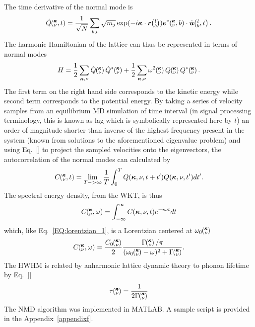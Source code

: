 %
The time derivative of the normal mode is
%
\begin{equation}
\dot{Q}\kvt=\frac{1}{\sqrt{N}}\sum_{b,l}\sqrt{m_j}\exp(-i\bm{\kappa}\cdot\bm{r}\lb)\bm{e}^*\kvb\cdot\dot{\bm{u}}\lbt.
\end{equation}
%
The harmonic Hamiltonian of the lattice can thus be represented in terms of normal modes
%
\begin{equation}
H=\frac{1}{2}\sum_{\bm{\kappa},\nu}\dot{Q}\kv\dot{Q}^*\kv+\frac{1}{2}\sum_{\bm{\kappa},\nu}\omega^2\kv Q\kv Q^*\kv.
\end{equation}
%
The first term on the right hand side corresponds to the kinetic energy while second term corresponds to the potential energy. By taking a series of velocity samples from an equilibrium MD simulation of time interval (in signal processing terminology, this is known as lag which is symbolically represented here by $t$) an order of magnitude shorter than inverse of the highest frequency present in the system (known from solutions to the aforementioned eigenvalue problem) and using Eq.~\ref{} to project the sampled velocities onto the eigenvectors, the autocorrelation of the normal modes can calculated by
%
\begin{equation}
C\mspace{-4.0mu}\left(\mspace{-8.0mu} \begin{smallmatrix}&\pmb{\kappa} \\&\nu\end{smallmatrix} \mspace{-2.0mu},t\right)=\lim_{T->\infty}\frac{1}{T}\int_{0}^{T}Q(\bm{\kappa},\nu,t+t')Q(\bm{\kappa},\nu,t')dt'.
\end{equation}
%
The spectral energy density, from the WKT, is thus
%
\begin{equation}
C\mspace{-4.0mu}\left(\mspace{-8.0mu} \begin{smallmatrix}&\pmb{\kappa} \\&\nu\end{smallmatrix} \mspace{-2.0mu},\omega\right)=\int_{-\infty}^{\infty}C(\bm{\kappa},\nu,t)e^{-i\omega t}dt
\end{equation}
%
which, like Eq.~\ref{EQ:lorentzian_1}, is a Lorentzian centered at $\omega_0\mspace{-4.0mu}\left(\mspace{-8.0mu} \begin{smallmatrix}&\pmb{\kappa} \\&\nu\end{smallmatrix} \mspace{-3.0mu}\right)$
%
\begin{equation}
C\kvw=\frac{C_0\kv}{2}\frac{\Gamma\kv/\pi}{(\omega_0\kv-\omega)^2+\Gamma\kv}.
\end{equation}
%
The HWHM is related by anharmonic lattice dynamic theory \cite{PhysRev.128.2589} to phonon lifetime by Eq.~\ref{}
%
\begin{equation}
\tau \mspace{-4.0mu}\left(\mspace{-8.0mu} \begin{smallmatrix}&\pmb{\kappa} \\&\nu\end{smallmatrix} \mspace{-3.0mu}\right)=\frac{1}{2\Gamma\mspace{-4.0mu}\left(\mspace{-8.0mu} \begin{smallmatrix}&\pmb{\kappa} \\&\nu\end{smallmatrix} \mspace{-3.0mu}\right)}
\end{equation}
%
The NMD algorithm was implemented in MATLAB. A sample script is provided in the Appendix~\ref{appendixf}.


